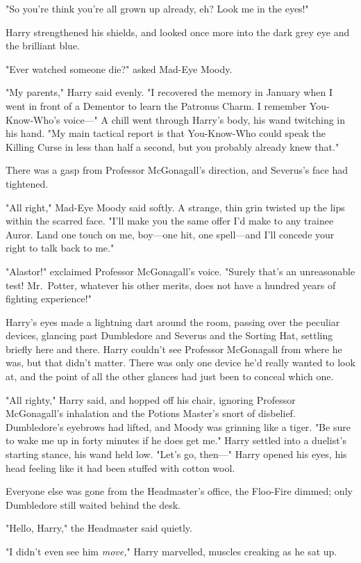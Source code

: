"So you're think you're all grown up already, eh? Look me in the eyes!"

Harry strengthened his shields, and looked once more into the dark grey eye and the brilliant blue.

"Ever watched someone die?" asked Mad-Eye Moody.

"My parents," Harry said evenly. "I recovered the memory in January when I went in front of a Dementor to learn the Patronus Charm. I remember You-Know-Who's voice---" A chill went through Harry's body, his wand twitching in his hand. "My main tactical report is that You-Know-Who could speak the Killing Curse in less than half a second, but you probably already knew that."

There was a gasp from Professor McGonagall's direction, and Severus's face had tightened.

"All right," Mad-Eye Moody said softly. A strange, thin grin twisted up the lips within the scarred face. "I'll make you the same offer I'd make to any trainee Auror. Land one touch on me, boy---one hit, one spell---and I'll concede your right to talk back to me."

"Alastor!" exclaimed Professor McGonagall's voice. "Surely that's an unreasonable test! Mr.~Potter, whatever his other merits, does not have a hundred years of fighting experience!"

Harry's eyes made a lightning dart around the room, passing over the peculiar devices, glancing past Dumbledore and Severus and the Sorting Hat, settling briefly here and there. Harry couldn't see Professor McGonagall from where he was, but that didn't matter. There was only one device he'd really wanted to look at, and the point of all the other glances had just been to conceal which one.

"All righty," Harry said, and hopped off his chair, ignoring Professor McGonagall's inhalation and the Potions Master's snort of disbelief. Dumbledore's eyebrows had lifted, and Moody was grinning like a tiger. "Be sure to wake me up in forty minutes if he does get me." Harry settled into a duelist's starting stance, his wand held low. "Let's go, then---"
\sbreak
Harry opened his eyes, his head feeling like it had been stuffed with cotton wool.

Everyone else was gone from the Headmaster's office, the Floo-Fire dimmed; only Dumbledore still waited behind the desk.

"Hello, Harry," the Headmaster said quietly.

"I didn't even see him \emph{move,}" Harry marvelled, muscles creaking as he sat up.

